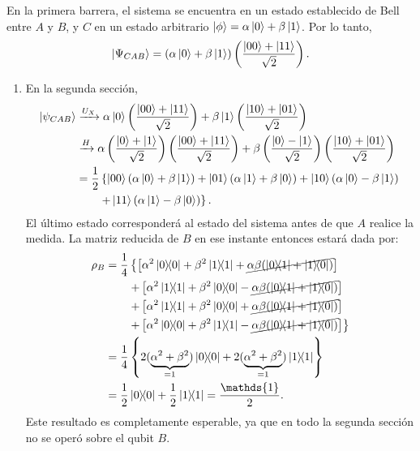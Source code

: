 \documentclass{scrartcl}
\newcommand{\inv}[1]{\frac{1}{#1}}
\DeclareRobustCommand{\[}{\begin{equation}}
\DeclareRobustCommand{\]}{\end{equation}}
\begin{document}
\begin{enumerate}
    En la primera barrera, el sistema se encuentra en un estado establecido de Bell entre $A$ y $B$, y $C$ en un estado arbitrario $\ket{\phi} = \alpha \ket{0} + \beta \ket{1}$. Por lo tanto,
    \[ \ket{\Psi_{CAB}} = \left( \alpha \ket{0} + \beta \ket{1} \right) \left( \frac{\ket{00} + \ket{11}}{\sqrt{2}} \right). \]
    \begin{enumerate}
        \item En la segunda sección,
        \begin{align}
            \ket{\psi_{CAB}} &\xrightarrow{U_X} \alpha \ket{0} \left( \frac{\ket{00} + \ket{11}}{\sqrt{2}} \right) + \beta \ket{1} \left( \frac{\ket{10} + \ket{01}}{\sqrt{2}} \right) \\
                &\xrightarrow{H} \alpha \left( \frac{\ket{0} + \ket{1}}{\sqrt{2}} \right) \left( \frac{\ket{00} + \ket{11}}{\sqrt{2}} \right) + \beta \left( \frac{\ket{0} - \ket{1}}{\sqrt{2}} \right) \left( \frac{\ket{10} + \ket{01}}{\sqrt{2}} \right) \\
                &= \inv{2} \left\{ \ket{00} (\alpha \ket{0} + \beta \ket{1}) + \ket{01} (\alpha \ket{1} + \beta \ket{0}) + \ket{10} (\alpha \ket{0} - \beta \ket{1}) \right. \\
                &\quad \quad \left. + \ket{11} (\alpha \ket{1} - \beta \ket{0}) \right\}.
        \end{align}
        El último estado corresponderá al estado del sistema antes de que $A$ realice la medida. La matriz reducida de $B$ en ese instante entonces estará dada por:
        \begin{align}
            \rho_B &= \inv{4} \left\{ \left[ \alpha^2 \dyad{0}{0} + \beta^2 \dyad{1}{1} + \cancel{\alpha\beta (\dyad{0}{1} + \dyad{1}{0})} \right] \right. \\
            &\quad \quad \left. + \left[ \alpha^2 \dyad{1}{1} + \beta^2 \dyad{0}{0} - \cancel{\alpha\beta (\dyad{0}{1} + \dyad{1}{0})} \right] \right. \\
            &\quad \quad \left. + \left[ \alpha^2 \dyad{1}{1} + \beta^2 \dyad{0}{0} + \cancel{\alpha\beta (\dyad{0}{1} + \dyad{1}{0})} \right] \right. \\
            &\quad \quad \left. + \left[ \alpha^2 \dyad{0}{0} + \beta^2 \dyad{1}{1} - \cancel{\alpha\beta (\dyad{0}{1} + \dyad{1}{0})} \right] \right\} \\
            &= \inv{4} \left\{ 2(\underbrace{\alpha^2 + \beta^2}_{=1}) \dyad{0}{0} + 2(\underbrace{\alpha^2 + \beta^2}_{=1}) \dyad{1}{1} \right\} \\
            &= \inv{2} \dyad{0}{0} + \inv{2} \dyad{1}{1} = \frac{\mathds{1}}{2}.
        \end{align}
        Este resultado es completamente esperable, ya que en todo la segunda sección no se operó sobre el qubit $B$.
        

\end{enumerate}
\end{enumerate}
\end{document}
